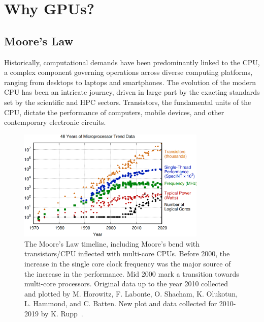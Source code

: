 \section{Why GPUs?}


\subsection{Moore’s Law}


\par
Historically, computational demands have been predominantly linked to the CPU, a complex component governing operations across diverse computing platforms, ranging from desktops to laptops and smartphones. The evolution of the modern CPU has been an intricate journey, driven in large part by the exacting standards set by the scientific and HPC sectors. Transistors, the fundamental units of the CPU, dictate the performance of computers, mobile devices, and other contemporary electronic circuits.

\begin{figure}[!h]
\centering\includegraphics[width=0.8\textwidth]{fig_logo_history/microprocessor_trend.png}
\caption{The Moore’s Law timeline, including Moore's bend with transistors/CPU inflected with multi-core CPUs. Before 2000, the increase in the single core clock frequency was the major source of the increase in the performance. Mid 2000 mark a transition towards multi-core processors. Original data up to the year 2010 collected and plotted by M. Horowitz, F. Labonte, O. Shacham, K. Olukotun, L. Hammond, and C. Batten. New plot and data collected for 2010-2019 by K. Rupp~\cite{microprocessor-trend-data}. }\label{fig:microprocessor_trend}
\end{figure}


